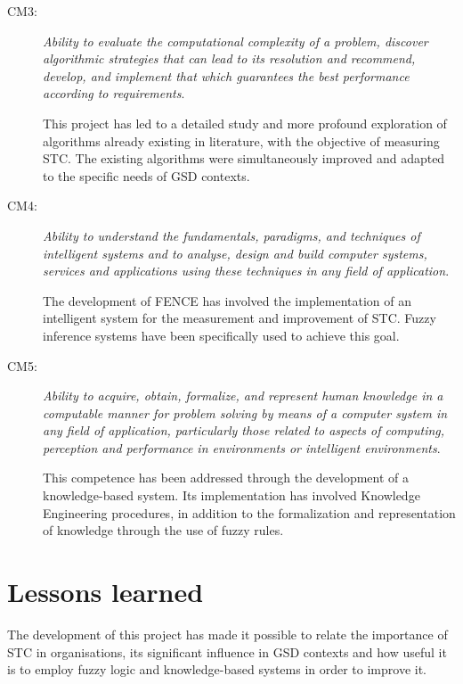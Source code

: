 \begin{description}
\item[CM3:]\emph{Ability to evaluate the computational complexity of a problem, discover algorithmic strategies that can lead to its resolution and recommend, develop, and implement that which guarantees the best performance according to requirements}.\newline  

	This project has led to a detailed study and more profound exploration of algorithms already existing in literature, with the objective of measuring STC. The existing algorithms were simultaneously improved and adapted to the specific needs of GSD contexts.\newline

\item[CM4:]\emph{Ability to understand the fundamentals, paradigms, and techniques of intelligent systems and to analyse, design and build computer systems, services and applications using these techniques in any field of application}.\newline 

	The development of FENCE has involved the implementation of an intelligent system for the measurement and improvement of STC. Fuzzy inference systems have been specifically used to achieve this goal.\newline

\item[CM5:]\emph{Ability to acquire, obtain, formalize, and represent human knowledge in a computable manner for problem solving by means of a computer system in any field of application, particularly those related to aspects of computing, perception and performance in environments or intelligent environments}.\newline 

	This competence has been addressed through the development of a knowledge-based system.  Its implementation has involved Knowledge Engineering procedures, in addition to the formalization and representation of knowledge through the use of fuzzy rules.

\end{description}

\section{Lessons learned}

The development of this project has made it possible to relate the importance of STC in organisations, its significant influence in GSD contexts and how useful it is to employ fuzzy logic and knowledge-based systems in order to improve it.

